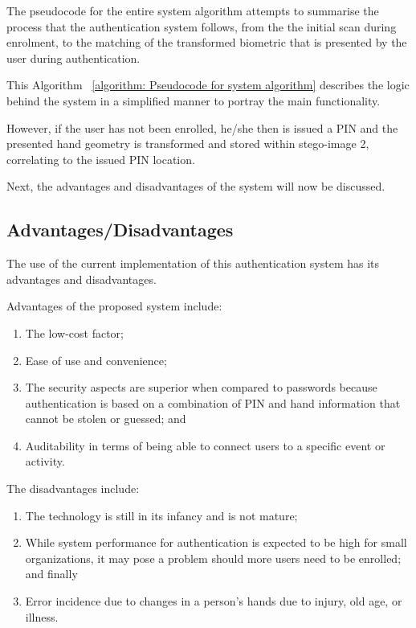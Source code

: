 

The pseudocode for the entire system algorithm attempts to summarise the process that the authentication system follows, from the the initial scan during enrolment, to the matching of the transformed biometric that is presented by the user during authentication. 

This Algorithm ~\ref{algorithm: Pseudocode for system algorithm} describes the logic behind the system in a simplified manner to portray the main functionality. 



However, if the user has not been enrolled, he/she then is issued a PIN and the presented hand geometry is transformed and stored within stego-image 2, correlating to the issued PIN location.

Next, the advantages and disadvantages of the system will now be discussed.

\subsection{Advantages/Disadvantages}

The use of the current implementation of this authentication system has its advantages and disadvantages.


Advantages of the proposed system include:
    \begin{enumerate}[label=\roman*.]
        \item The low-cost factor; 
        \item Ease of use and convenience;
        \item The security aspects are superior when compared to passwords because authentication is based on a combination of PIN and hand information that cannot be stolen or guessed; and
        \item Auditability in terms of being able to connect users to a specific event or activity.
    \end{enumerate}
	
The disadvantages include: 
    \begin{enumerate}[label=\roman*.]
        \item The technology is still in its infancy and is not mature;
        \item While system performance for authentication is expected to be high for small organizations, it may pose a problem should more users need to be enrolled; and finally
        \item Error incidence due to changes in a person’s hands due to injury, old age, or illness.
    \end{enumerate}

